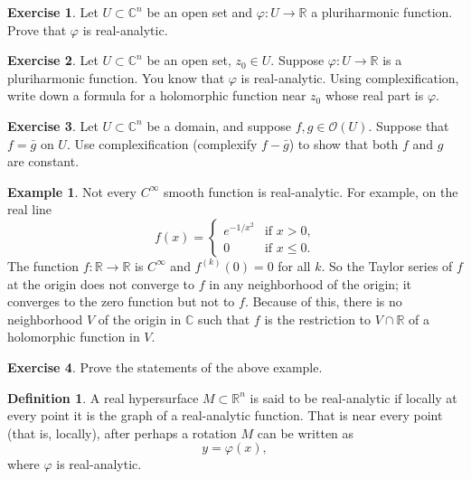\documentclass[12pt,openany]{book}
\newcommand{\C}{{\mathbb{C}}}
\newcommand{\R}{{\mathbb{R}}}
\newcommand{\sO}{{\mathscr{O}}}
\theoremstyle{plain}
\theoremstyle{remark}
\theoremstyle{definition}
\newtheorem{defn}[thm]{Definition}
\newenvironment{exbox}{%
    \def\FrameCommand{\vrule width 1pt \relax\hspace {10pt}}%
    \MakeFramed {\advance \hsize -\width \FrameRestore }%
}{%
    \endMakeFramed
}
\theoremstyle{exercise}
\newtheorem{exercise}{Exercise}[section]
\theoremstyle{example}
\newtheorem{example}[thm]{Example}
\begin{document}
\begin{exbox}
\begin{exercise}
Let $U \subset \C^n$ be an open set and $\varphi \colon U \to \R$ a
pluriharmonic function.  Prove that $\varphi$ is real-analytic.
\end{exercise}

\begin{exercise}
Let $U \subset \C^n$ be an open set, $z_0 \in U$.
Suppose $\varphi \colon U \to \R$ is a pluriharmonic function.
You know that $\varphi$ is real-analytic.
Using complexification, write down a formula for a holomorphic function near
$z_0$ whose real part is $\varphi$.
\end{exercise}

\begin{exercise}
Let $U \subset \C^n$ be a domain, and suppose $f, g \in \sO(U)$.
Suppose that $f = \bar{g}$ on $U$.  Use complexification (complexify
$f-\bar{g}$) to show that both $f$ and $g$ are constant.
\end{exercise}
\end{exbox}

\begin{example}
Not every $C^\infty$ smooth function is real-analytic.  For example,
on the real line
\begin{equation*}
f(x) =
\begin{cases}
e^{-1/x^2} & \text{if $x > 0$,} \\
0 & \text{if $x \leq 0$.}
\end{cases}
\end{equation*}
The function
$f \colon \R \to \R$ is $C^\infty$ and $f^{(k)}(0) = 0$ for all $k$.
So the Taylor series of $f$ at the origin does
not converge to $f$ in any neighborhood of the origin; it converges to the
zero function but not to $f$.
Because of this, there is no neighborhood $V$ of the origin in $\C$ such that
$f$ is the restriction to $V \cap \R$ of a holomorphic function in $V$.
\end{example}

\begin{exbox}
\begin{exercise}
Prove the statements of the above example.
\end{exercise}
\end{exbox}

\begin{defn}
A real hypersurface $M \subset \R^n$ is said to be real-analytic
if locally at every point it is the graph of a real-analytic function.  That
is near every point (that is, locally), after perhaps a rotation $M$ can be written as
\begin{equation*}
y = \varphi(x) ,
\end{equation*}
where $\varphi$ is real-analytic.
\end{defn}
\end{document}
